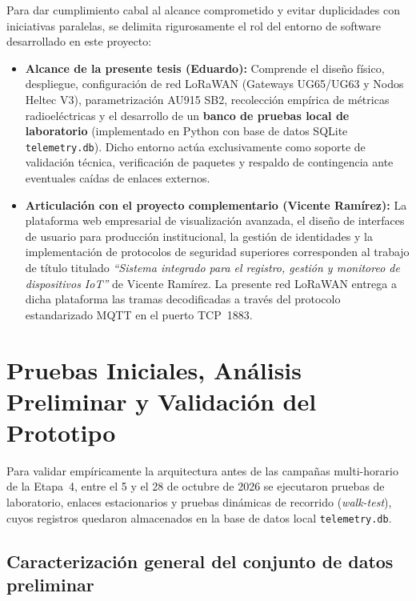 \documentclass[12pt,oneside,openany,spanish,oldfontcommands]{memoir}
\begin{document}
Para dar cumplimiento cabal al alcance comprometido y evitar duplicidades con iniciativas paralelas,
se delimita rigurosamente el rol del entorno de software desarrollado en este proyecto:
\begin{itemize}
    \item \textbf{Alcance de la presente tesis (Eduardo):} Comprende el diseño físico, despliegue,
    configuración de red LoRaWAN (Gateways UG65/UG63 y Nodos Heltec V3), parametrización AU915 SB2,
    recolección empírica de métricas radioeléctricas y el desarrollo de un \textbf{banco de pruebas local de
    laboratorio} (implementado en Python con base de datos SQLite \texttt{telemetry.db}). Dicho entorno
    actúa exclusivamente como soporte de validación técnica, verificación de paquetes y respaldo de
    contingencia ante eventuales caídas de enlaces externos.

    \item \textbf{Articulación con el proyecto complementario (Vicente Ramírez):} La plataforma web
    empresarial de visualización avanzada, el diseño de interfaces de usuario para producción institucional,
    la gestión de identidades y la implementación de protocolos de seguridad superiores corresponden al
    trabajo de título titulado \textit{``Sistema integrado para el registro, gestión y monitoreo de
    dispositivos IoT''} de Vicente Ramírez. La presente red LoRaWAN entrega a dicha plataforma las
    tramas decodificadas a través del protocolo estandarizado MQTT en el puerto TCP~1883.
\end{itemize}

\chapter{Pruebas Iniciales, Análisis Preliminar y Validación del Prototipo}\label{cap:pruebas-preliminares}

Para validar empíricamente la arquitectura antes de las campañas multi-horario de la Etapa~4, entre el 5 y el 28 de octubre de 2026 se ejecutaron pruebas de laboratorio, enlaces estacionarios y pruebas dinámicas de recorrido (\textit{walk-test}), cuyos registros quedaron almacenados en la base de datos local \texttt{telemetry.db}.

\section{Caracterización general del conjunto de datos preliminar}\label{sec:dataset-preliminar}
\end{document}
